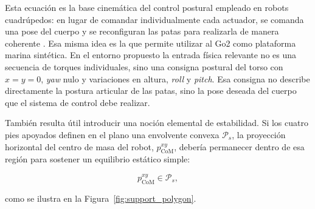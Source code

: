 \documentclass[12pt,a4paper]{report}
\begin{document}
Esta ecuación es la base cinemática del control postural empleado en robots
cuadrúpedos: en lugar de comandar individualmente cada actuador, se comanda una
pose del cuerpo y se reconfiguran las patas para realizarla de manera coherente
\citep{Bellicoso2017,Fahmi2019}. Esa misma idea es la que permite utilizar al Go2
como plataforma marina sintética. En el entorno propuesto la entrada física
relevante no es una secuencia de torques individuales, sino una consigna postural
del torso con \(x=y=0\), \emph{yaw} nulo y variaciones en altura, \emph{roll} y
\emph{pitch}. Esa consigna no describe directamente la postura articular de las
patas, sino la pose deseada del cuerpo que el sistema de control debe realizar.

También resulta útil introducir una noción elemental de estabilidad. Si los
cuatro pies apoyados definen en el plano una envolvente convexa
\(\mathcal{P}_s\), la proyección horizontal del centro de masa del robot,
\(p_{\text{CoM}}^{xy}\), debería permanecer dentro de esa región para sostener
un equilibrio estático simple:

\begin{equation}
p_{\text{CoM}}^{xy} \in \mathcal{P}_s,
\label{eq:support_polygon_condition}
\end{equation}

como se ilustra en la Figura~\ref{fig:support_polygon}.
\end{document}
